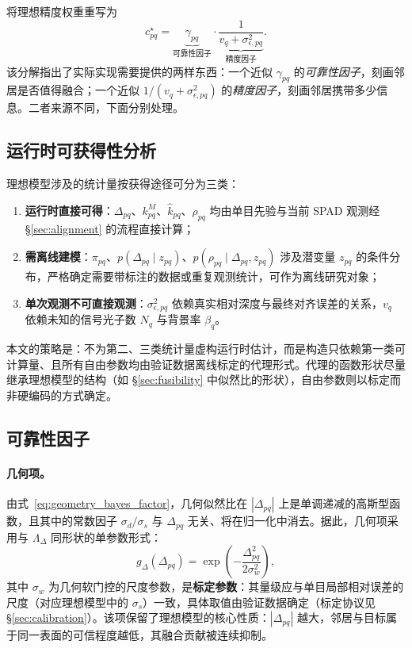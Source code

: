 \documentclass[11pt,a4paper]{ctexart}
\numberwithin{equation}{section}
\begin{document}
将理想精度权重重写为
\begin{equation}
    c_{pq}^{\star}
    =
    \underbrace{\gamma_{pq}}_{\text{可靠性因子}}
    \cdot
    \underbrace{\frac{1}{v_q+\sigma_{\epsilon,pq}^{2}}}_{\text{精度因子}}.
    \label{eq:ideal_bayesian_precision}
\end{equation}
该分解指出了实际实现需要提供的两样东西：一个近似 $\gamma_{pq}$ 的\emph{可靠性因子}，刻画邻居是否值得融合；一个近似 $1/(v_q+\sigma_{\epsilon,pq}^{2})$ 的\emph{精度因子}，刻画邻居携带多少信息。二者来源不同，下面分别处理。

\subsection{运行时可获得性分析}

理想模型涉及的统计量按获得途径可分为三类：

\begin{enumerate}
    \item \textbf{运行时直接可得}：$\Delta_{pq}$、$k_{pq}^{M}$、$\hat k_{pq}$、$\rho_{pq}$ 均由单目先验与当前 SPAD 观测经 \S\ref{sec:alignment} 的流程直接计算；
    \item \textbf{需离线建模}：$\pi_{pq}$、$p(\Delta_{pq}\mid z_{pq})$、$p(\rho_{pq}\mid\Delta_{pq},z_{pq})$ 涉及潜变量 $z_{pq}$ 的条件分布，严格确定需要带标注的数据或重复观测统计，可作为离线研究对象；
    \item \textbf{单次观测不可直接观测}：$\sigma_{\epsilon,pq}^{2}$ 依赖真实相对深度与最终对齐误差的关系，$v_q$ 依赖未知的信号光子数 $N_q$ 与背景率 $\beta_q$。
\end{enumerate}

本文的策略是：不为第二、三类统计量虚构运行时估计，而是构造只依赖第一类可计算量、且所有自由参数均由验证数据离线标定的代理形式。代理的函数形状尽量继承理想模型的结构（如 \S\ref{sec:fusibility} 中似然比的形状），自由参数则以标定而非硬编码的方式确定。

\subsection{可靠性因子}
\label{sec:reliability_factor}

\paragraph{几何项。}
由式~\eqref{eq:geometry_bayes_factor}，几何似然比在 $|\Delta_{pq}|$ 上是单调递减的高斯型函数，且其中的常数因子 $\sigma_d/\sigma_s$ 与 $\Delta_{pq}$ 无关、将在归一化中消去。据此，几何项采用与 $\Lambda_\Delta$ 同形状的单参数形式：
\begin{equation}
    g_{\Delta}(\Delta_{pq})
    =
    \exp\!\left(
    -\frac{\Delta_{pq}^{2}}
    {2\sigma_w^{2}}
    \right),
    \label{eq:engineering_geometry_gate}
\end{equation}
其中 $\sigma_w$ 为几何软门控的尺度参数，是\textbf{标定参数}：其量级应与单目局部相对误差的尺度（对应理想模型中的 $\sigma_s$）一致，具体取值由验证数据确定（标定协议见 \S\ref{sec:calibration}）。该项保留了理想模型的核心性质：$|\Delta_{pq}|$ 越大，邻居与目标属于同一表面的可信程度越低，其融合贡献被连续抑制。
\end{document}
